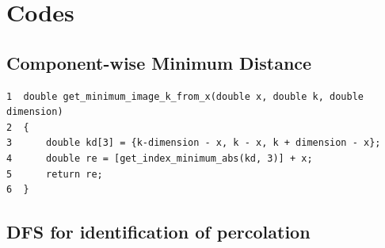 \documentclass[11pt]{article}
\begin{document}
\section{Codes}
\label{sec:orgheadline19}

\subsection{Component-wise Minimum Distance}
\label{sec:orgheadline17}
\begin{verbatim}
1  double get_minimum_image_k_from_x(double x, double k, double dimension)
2  {
3      double kd[3] = {k-dimension - x, k - x, k + dimension - x};
4      double re = [get_index_minimum_abs(kd, 3)] + x;
5      return re;
6  }
\end{verbatim}

\subsection{DFS for identification of percolation}
\label{sec:orgheadline18}
\end{document}
